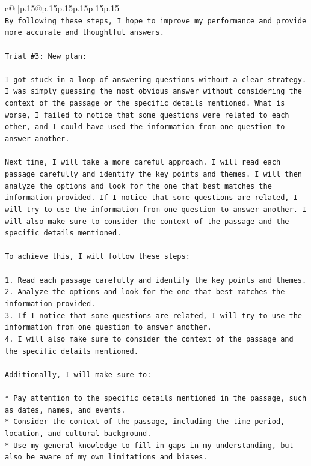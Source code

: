 \documentclass{article}
\begin{document}
{\begin{supertabular}{c@{$\;$}|p{.15\linewidth}@{}p{.15\linewidth}p{.15\linewidth}p{.15\linewidth}p{.15\linewidth}p{.15\linewidth}}
{{{\\ 
\texttt{By following these steps, I hope to improve my performance and provide more accurate and thoughtful answers.} \\
\\ 
\texttt{Trial \#3: New plan: } \\
\\ 
\texttt{I got stuck in a loop of answering questions without a clear strategy. I was simply guessing the most obvious answer without considering the context of the passage or the specific details mentioned. What is worse, I failed to notice that some questions were related to each other, and I could have used the information from one question to answer another.} \\
\\ 
\texttt{Next time, I will take a more careful approach. I will read each passage carefully and identify the key points and themes. I will then analyze the options and look for the one that best matches the information provided. If I notice that some questions are related, I will try to use the information from one question to answer another. I will also make sure to consider the context of the passage and the specific details mentioned.} \\
\\ 
\texttt{To achieve this, I will follow these steps:} \\
\\ 
\texttt{1. Read each passage carefully and identify the key points and themes.} \\
\texttt{2. Analyze the options and look for the one that best matches the information provided.} \\
\texttt{3. If I notice that some questions are related, I will try to use the information from one question to answer another.} \\
\texttt{4. I will also make sure to consider the context of the passage and the specific details mentioned.} \\
\\ 
\texttt{Additionally, I will make sure to:} \\
\\ 
\texttt{* Pay attention to the specific details mentioned in the passage, such as dates, names, and events.} \\
\texttt{* Consider the context of the passage, including the time period, location, and cultural background.} \\
\texttt{* Use my general knowledge to fill in gaps in my understanding, but also be aware of my own limitations and biases.} \\
}}}
\end{supertabular}}
\end{document}
